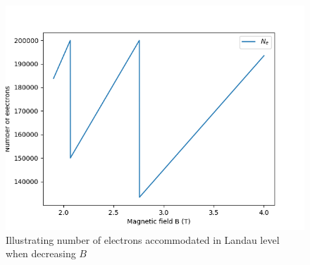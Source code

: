 \documentclass{beamer}
\begin{document}
\begin{frame}
\begin{columns}
\begin{column}{0.5\linewidth}
{\begin{figure}
\includegraphics[width = \linewidth]{images/Ne.png}
\caption{Illustrating number of electrons accommodated in Landau level when decreasing \(B\)}
\end{figure}}
\end{column}
\end{columns}
\end{frame}
\end{document}
